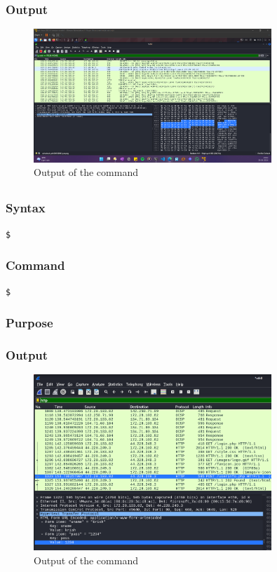 \documentclass[11pt]{article}
\begin{document}
\subsubsection*{Output}
\begin{figure}[H]
    \centering
    \includegraphics[width=0.8\textwidth]{assignment 8 (1).png}
    \caption{Output of the command}
    \label{fig:1}
\end{figure}

\subsection{}

\subsubsection*{Syntax}
\begin{verbatim}
$
\end{verbatim}

\subsubsection*{Command}
\begin{verbatim}
$
\end{verbatim}

\subsubsection*{Purpose}

\subsubsection*{Output}
\begin{figure}[H]
    \centering
    \includegraphics[width=0.8\textwidth]{assignment 8 (2).png}
    \caption{Output of the command}
    \label{fig:1}
\end{figure}
\end{document}
